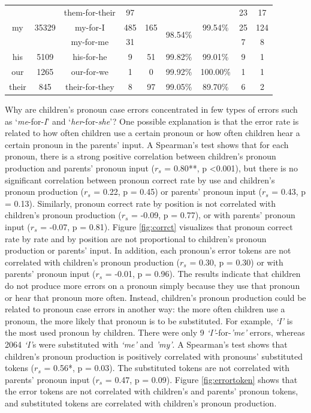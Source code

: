 \begin{table}[h]
\begin{tabular}{c|cccccccc}
 &  & them-for-their & 97 &  &  &  & 23 & 17 \\
my & 35329 & my-for-I & 485 & 165 & \multirow{2}{*}{98.54\%} & 99.54\% & 25 & 124 \\
 &  & my-for-me & 31 &  &  &  & 7 & 8 \\
his & 5109 & his-for-he & 9 & 51 & 99.82\% & 99.01\% & 9 & 1 \\
our & 1265 & our-for-we & 1 & 0 & 99.92\% & 100.00\% & 1 & 1 \\
their & 845 & their-for-they & 8 & 97 & 99.05\% & 89.70\% & 6 & 2\\
\hline
\end{tabular}
\end{table}
\FloatBarrier

Why are children's pronoun case errors concentrated in few types of errors such as `\textit{me}-for-\textit{I}' and `\textit{her}-for-\textit{she}'? One possible explanation is that the error rate is related to how often children use a certain pronoun or how often children hear a certain pronoun in the parents' input. A Spearman's test shows that for each pronoun, there is a strong positive correlation between children's pronoun production and parents' pronoun input ($r_s$ = 0.80**, p <0.001), but there is no significant correlation between pronoun correct rate by use and children's pronoun production ($r_s$ = 0.22, p = 0.45) or parents' pronoun input ($r_s$ = 0.43, p = 0.13). Similarly, pronoun correct rate by position is not correlated with children's pronoun production ($r_s$ = -0.09, p = 0.77), or with parents' pronoun input ($r_s$ = -0.07, p = 0.81). Figure \ref{fig:corrct} visualizes that pronoun correct rate by rate and by position are not proportional to children's pronoun production or parents' input. In addition, each pronoun's error tokens are not correlated with children's pronoun production ($r_s$ = 0.30, p = 0.30) or with parents' pronoun input ($r_s$ = -0.01, p = 0.96). The results indicate that children do not produce more errors on a pronoun simply because they use that pronoun or hear that pronoun more often. Instead, children's pronoun production could be related to pronoun case errors in another way: the more often children use a pronoun, the more likely that pronoun is to be substituted. For example, \textit{`I'} is the most used pronoun by children. There were only 9 \textit{`I'}-for-\textit{'me'} errors, whereas 2064 \textit{`I'}s were substituted with \textit{`me'} and \textit{'my'}. A Spearman's test shows that children's pronoun production is positively correlated with pronouns' substituted tokens ($r_s$ = 0.56*, p = 0.03). The substituted tokens are not correlated with parents' pronoun input ($r_s$ = 0.47, p = 0.09). Figure \ref{fig:errortoken} shows that the error tokens are not correlated with children's and parents' pronoun tokens, and substituted tokens are correlated with children's pronoun production.


